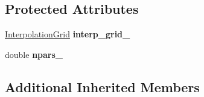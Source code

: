 \subsection*{Protected Attributes}
\begin{DoxyCompactItemize}
\item 
\hypertarget{class_kernel_bicop_a38c072985270dd91e2424d4453ee94a0}{\hyperlink{class_interpolation_grid}{Interpolation\+Grid} {\bfseries interp\+\_\+grid\+\_\+}}\label{class_kernel_bicop_a38c072985270dd91e2424d4453ee94a0}

\item 
\hypertarget{class_kernel_bicop_aab4f58d0b48ffba37fc617ba7ea9de56}{double {\bfseries npars\+\_\+}}\label{class_kernel_bicop_aab4f58d0b48ffba37fc617ba7ea9de56}

\end{DoxyCompactItemize}
\subsection*{Additional Inherited Members}
